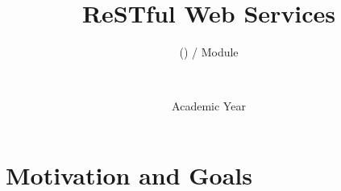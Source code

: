 \documentclass[presentation]{beamer}\mode<presentation>{\usetheme{AMSBolognaFC}}
\title[\currentLab{} -- ReSTful WS]{ReSTful Web Services}
\subtitle{\courseName{} (\courseAcronym) / Module \moduleN{}}
\author[\sspeaker{\gcShort} \& \mmShort]{
    \speaker{\gcFull} \and \mmFull
    \\ 
    \gcEmail \and \mmEmail
}
\institute[\disiShort, \uniboShort]{\disi{} (\disiShort)\\\unibo}
\date[A.Y. \academicYear{}]{Academic Year \academicYear{}}
\begin{document}

\frame{\titlepage}

\section{Motivation and Goals}
\end{document}
